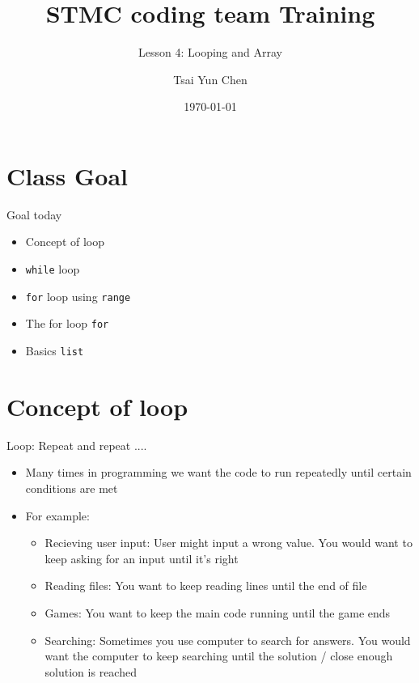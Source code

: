 \documentclass[10pt,xcolor={table,dvipsnames},t]{beamer}
\title[Your Short Title]{STMC coding team Training}
\subtitle{Lesson 4: Looping and Array}
\author{Tsai Yun Chen}
\date{\today}
\begin{document}
\begin{frame}
  \titlepage
\end{frame}


\section{Class Goal}

\begin{frame}{Goal today}

\begin{itemize}
  \item Concept of loop
  \item \texttt{while} loop
  \item \texttt{for} loop using \texttt{range}
  \item The for loop \texttt{for}
  \item Basics \texttt{list} 
\end{itemize}

\end{frame}


\section{Concept of loop}
\begin{frame}{Loop: Repeat and repeat ....}
    \begin{itemize}
      \item Many times in programming we want the code to run repeatedly until certain conditions are met
      \vspace{2mm}
      \item For example:
      \begin{itemize}
        \item Recieving user input: User might input a wrong value. You would want to keep asking for an input until it's right
        \item Reading files: You want to keep reading lines until the end of file 
        \item Games: You want to keep the main code running until the game ends
        \item Searching: Sometimes you use computer to search for answers. You would want the computer to keep searching until the solution / close enough solution is reached
      \end{itemize}
    \end{itemize}
\end{frame}
\end{document}
